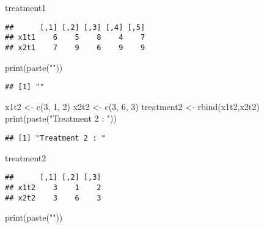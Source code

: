 \documentclass[
]{article}
\newenvironment{Shaded}{\begin{snugshade}}{\end{snugshade}}
\newcommand{\DecValTok}[1]{\textcolor[rgb]{0.00,0.00,0.81}{#1}}
\newcommand{\FunctionTok}[1]{\textcolor[rgb]{0.00,0.00,0.00}{#1}}
\newcommand{\NormalTok}[1]{#1}
\newcommand{\OtherTok}[1]{\textcolor[rgb]{0.56,0.35,0.01}{#1}}
\newcommand{\StringTok}[1]{\textcolor[rgb]{0.31,0.60,0.02}{#1}}
\begin{document}
\begin{Shaded}
\begin{Highlighting}[]
\NormalTok{treatment1}
\end{Highlighting}
\end{Shaded}

\begin{verbatim}
##      [,1] [,2] [,3] [,4] [,5]
## x1t1    6    5    8    4    7
## x2t1    7    9    6    9    9
\end{verbatim}

\begin{Shaded}
\begin{Highlighting}[]
\FunctionTok{print}\NormalTok{(}\FunctionTok{paste}\NormalTok{(}\StringTok{""}\NormalTok{))}
\end{Highlighting}
\end{Shaded}

\begin{verbatim}
## [1] ""
\end{verbatim}

\begin{Shaded}
\begin{Highlighting}[]
\NormalTok{x1t2 }\OtherTok{\textless{}{-}} \FunctionTok{c}\NormalTok{(}\DecValTok{3}\NormalTok{, }\DecValTok{1}\NormalTok{, }\DecValTok{2}\NormalTok{)}
\NormalTok{x2t2 }\OtherTok{\textless{}{-}} \FunctionTok{c}\NormalTok{(}\DecValTok{3}\NormalTok{, }\DecValTok{6}\NormalTok{, }\DecValTok{3}\NormalTok{)}
\NormalTok{treatment2 }\OtherTok{\textless{}{-}} \FunctionTok{rbind}\NormalTok{(x1t2,x2t2)}
\FunctionTok{print}\NormalTok{(}\FunctionTok{paste}\NormalTok{(}\StringTok{"Treatment 2 : "}\NormalTok{))}
\end{Highlighting}
\end{Shaded}

\begin{verbatim}
## [1] "Treatment 2 : "
\end{verbatim}

\begin{Shaded}
\begin{Highlighting}[]
\NormalTok{treatment2}
\end{Highlighting}
\end{Shaded}

\begin{verbatim}
##      [,1] [,2] [,3]
## x1t2    3    1    2
## x2t2    3    6    3
\end{verbatim}

\begin{Shaded}
\begin{Highlighting}[]
\FunctionTok{print}\NormalTok{(}\FunctionTok{paste}\NormalTok{(}\StringTok{""}\NormalTok{))}
\end{Highlighting}
\end{Shaded}
\end{document}
